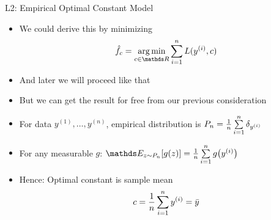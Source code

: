 \documentclass[11pt,compress,t,notes=noshow, xcolor=table]{beamer}
\begin{document}
\begin{vbframe}{L2: Empirical Optimal Constant Model}

\begin{itemize}
\item We could derive this by minimizing  
$$\hat{f}_c = \argminlim_{c \in \R} \sumin L(\yi,c)$$

\item And later we will proceed like that
\item But we can get the result for free from our previous 
  consideration
  
\item For data $y^{(1)}, \ldots, y^{(n)}$, empirical distribution is $P_n = \frac{1}{n} \sum\limits_{i=1}^n \delta_{y^{(i)}}$
\item For any measurable $g$: $\E_{z\sim P_n}[g(z)] = \meanin g\bigl(\yi\bigr)$
\item Hence: Optimal constant is sample mean
\[
c = \frac{1}{n} \sum\limits_{i=1}^n y^{(i)} = \bar{y}
\]


\end{itemize}


\end{vbframe}
\end{document}
